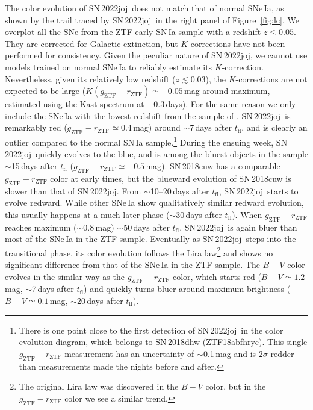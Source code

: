 \documentclass[twocolumn]{aastex631}
\newcommand{\sn}{SN\,2022joj}
\newcommand{\tfl}{$t_\mathrm{fl}$}
\begin{document}
\begin{CJK*}{UTF8}{gbsn}
The color evolution of \sn\ does not match that of normal SNe\,Ia, as shown by the trail traced by \sn\ in the right panel of Figure~\ref{fig:lc}. We overplot all the SNe from the ZTF early SN\,Ia sample \citep{Bulla2020} with a redshift $z\le0.05$. They are corrected for Galactic extinction, but $K$-corrections have not been performed for consistency. Given the peculiar nature of \sn, we cannot use models trained on normal SNe\,Ia to reliably estimate its $K$-correction. Nevertheless, given its relatively low redshift ($z\lesssim0.03$), the $K$-corrections are not expected to be large ($K(g_\mathrm{ZTF}-r_\mathrm{ZTF})\simeq-0.05$\,mag around maximum, estimated using the Kast spectrum at $-0.3$\,days). For the same reason we only include the SNe\,Ia with the lowest redshift from the sample of \citet{Bulla2020}. 
\sn\ is remarkably red ($g_\mathrm{ZTF} - r_\mathrm{ZTF}\simeq0.4$\,mag) around $\sim$7\,days after $t_\mathrm{fl}$, and is clearly an outlier compared to the normal SN\,Ia sample.\footnote{There is one point close to the first detection of \sn\ in the color evolution diagram, which belongs to SN\,2018dhw (ZTF18abfhryc). This single $g_\mathrm{ZTF}-r_\mathrm{ZTF}$ measurement has an uncertainty of $\sim$0.1\,mag and is 2$\sigma$ redder than measurements made the nights before and after.} 
During the ensuing week, \sn\ quickly evolves to the blue, and is among the bluest objects in the sample $\sim$15\,days after $t_\mathrm{fl}$ ($g_\mathrm{ZTF} - r_\mathrm{ZTF}\simeq -0.5$\,mag). SN\,2018cuw has a comparable $g_\mathrm{ZTF} - r_\mathrm{ZTF}$ color at early times, but the blueward evolution of SN\,2018cuw is slower than that of \sn. 
From $\sim$10--20\,days after \tfl, \sn\ starts to evolve redward. While other SNe\,Ia show qualitatively similar redward evolution, this usually happens at a much later phase ($\sim$30\,days after \tfl). 
When $g_\mathrm{ZTF} - r_\mathrm{ZTF}$ reaches maximum ($\sim$0.8\,mag) $\sim$50\,days after \tfl, \sn\ is again bluer than most of the SNe\,Ia in the ZTF sample. 
Eventually as \sn\ steps into the transitional phase, its color evolution follows the Lira law\footnote{The original Lira law was discovered in the $B-V$ color, but in the $g_\mathrm{ZTF}-r_\mathrm{ZTF}$ color we see a similar trend.} \citep{Lira_1996,Phillips_1999} and shows no significant difference from that of the SNe\,Ia in the ZTF sample.
The $B-V$ color evolves in the similar way as the $g_\mathrm{ZTF}-r_\mathrm{ZTF}$ color, which starts red ($B-V\simeq1.2$\,mag, $\sim$7\,days after \tfl) and quickly turns bluer around maximum brightness ($B-V\simeq0.1$\,mag, $\sim$20\,days after \tfl).


\end{CJK*}
\end{document}
